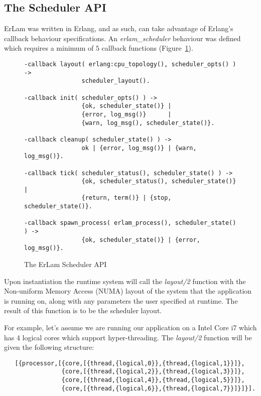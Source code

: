 \subsection{The Scheduler API}\label{sec:the scheduler api}

ErLam was written in Erlang, and as such, can take advantage of Erlang's 
callback behaviour specifications. An \emph{erlam\_scheduler} behaviour was
defined which requires a minimum of $5$ callback functions 
(Figure~\ref{fig:scheduler-api}).

\begin{figure}
    \begin{verbatim}
-callback layout( erlang:cpu_topology(), scheduler_opts() ) -> 
                scheduler_layout().

-callback init( scheduler_opts() ) -> 
                {ok, scheduler_state()} |
                {error, log_msg()}      |
                {warn, log_msg(), scheduler_state()}.

-callback cleanup( scheduler_state() ) -> 
                ok | {error, log_msg()} | {warn, log_msg()}.

-callback tick( scheduler_status(), scheduler_state() ) -> 
                {ok, scheduler_status(), scheduler_state()} |
                {return, term()} | {stop, scheduler_state()}. 

-callback spawn_process( erlam_process(), scheduler_state() ) -> 
                {ok, scheduler_state()} | {error, log_msg()}.
\end{verbatim}
\caption{The ErLam Scheduler API}
\label{fig:scheduler-api}
\end{figure}

Upon instantiation the runtime system will call the 
\emph{layout/2} function with the Non-uniform Memory Access (NUMA) layout 
of the system that the application is
running on, along with any parameters the user specified at runtime. The 
result of this function is to be the scheduler layout. 

For example, let's assume we are running our application on a Intel Core i7 
which has 4 logical cores which support hyper-threading. The \emph{layout/2}
function will be given the following structure: 

{\footnotesize 
\begin{verbatim}
   [{processor,[{core,[{thread,{logical,0}},{thread,{logical,1}}]},
                {core,[{thread,{logical,2}},{thread,{logical,3}}]},
                {core,[{thread,{logical,4}},{thread,{logical,5}}]},
                {core,[{thread,{logical,6}},{thread,{logical,7}}]}]}].
\end{verbatim}
} 

